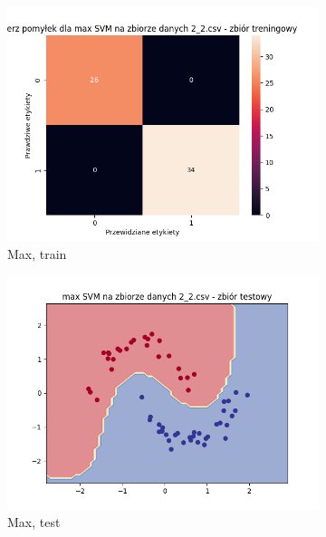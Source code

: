 \documentclass[12pt]{article}
\newcommand*{\subfigwidth}{0.24\textwidth}
\begin{document}
\begin{figure}[H]
\begin{subfigure}[t]{\subfigwidth}
        \includegraphics[width=\linewidth]{img/exp_3/svm/2_2/max/train_matrix.png}
        \caption{Max, train}
    \end{subfigure}
    \hfill
    \begin{subfigure}[t]{\subfigwidth}
        \includegraphics[width=\linewidth]{img/exp_3/svm/2_2/max/test_boundary.png}
        \caption{Max, test}
    \end{subfigure}
    \hfill
    \begin{subfigure}[t]{\subfigwidth}

\end{subfigure}
\end{figure}
\end{document}
